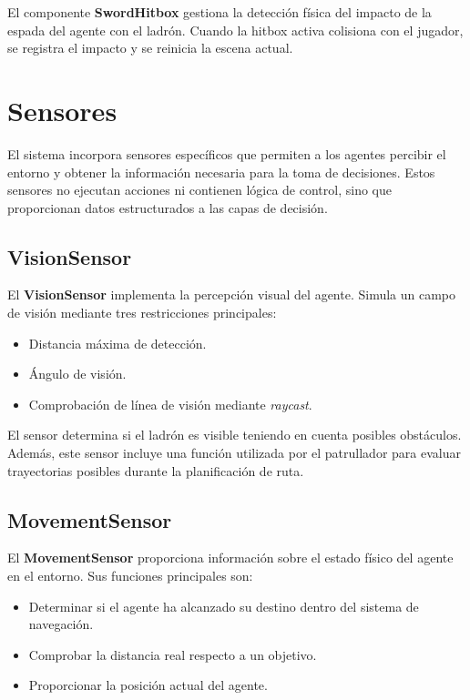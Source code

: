 \documentclass[a4paper,12pt]{article}
\begin{document}
El componente \textbf{SwordHitbox} gestiona la detección física del impacto de la espada del agente con el ladrón. Cuando la hitbox activa colisiona con el jugador, se registra el impacto y se reinicia la escena actual.


\section{Sensores}

El sistema incorpora sensores específicos que permiten a los agentes percibir el entorno y obtener la información necesaria para la toma de decisiones. Estos sensores no ejecutan acciones ni contienen lógica de control, sino que proporcionan datos estructurados a las capas de decisión.

\subsection*{VisionSensor}

El \textbf{VisionSensor} implementa la percepción visual del agente. Simula un campo de visión mediante tres restricciones principales:

\begin{itemize}
    \item Distancia máxima de detección.
    \item Ángulo de visión.
    \item Comprobación de línea de visión mediante \textit{raycast}.
\end{itemize}

El sensor determina si el ladrón es visible teniendo en cuenta posibles obstáculos. Además, este sensor incluye una función utilizada por el patrullador para evaluar trayectorias posibles durante la planificación de ruta.

\subsection*{MovementSensor}

El \textbf{MovementSensor} proporciona información sobre el estado físico del agente en el entorno. Sus funciones principales son:

\begin{itemize}
    \item Determinar si el agente ha alcanzado su destino dentro del sistema de navegación.
    \item Comprobar la distancia real respecto a un objetivo.
    \item Proporcionar la posición actual del agente.
\end{itemize}
\end{document}
